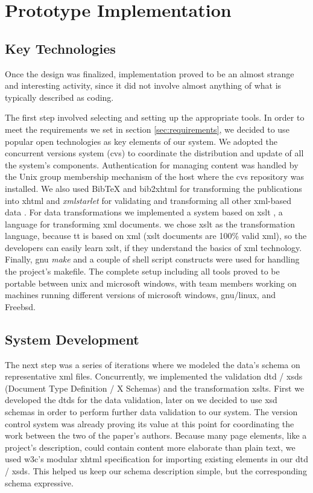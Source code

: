 \documentclass[10pt]{article}
\begin{document}
\section{Prototype Implementation}

\subsection{Key Technologies}
\label{subsec:key-tech}

Once the design was finalized,
implementation proved to be an almost strange and interesting activity,
since it did not involve almost anything of what
is typically described as coding.

The first step involved selecting and setting up the
appropriate tools. In order to meet the requirements we set in section \ref{sec:requirements}, 
we decided to use popular open
technologies as key elements of our system.
We adopted the concurrent versions system
({\sc cvs}) \cite{BF01, CVS} to coordinate the distribution
and update of all the system's components.
Authentication for managing content was handled by the
Unix group membership mechanism of the host where the
{\sc cvs} repository was installed.
We also used
{\sc BibTeX} \cite{Pa88, Lam94} and {\sc bib2xhtml} \cite{BibXHMTL} for transforming the publications
into {\sc xhtml} and
\textit{xmlstarlet} \cite{Gru04} for validating and transforming
all other {\sc xml}-based data \cite{W3C_XML}.
For data transformations we 
implemented a system based on {\sc xslt} \cite{W3C_XSLT}, a language for transforming {\sc xml} documents.
we chose {\sc xslt} as the transformation language, because tt is based on {\sc xml} ({\sc xslt} documents are 100\% valid {\sc xml}), so the
developers can easily learn xslt, if they understand the basics of {\sc xml} technology.
Finally, {\sc gnu} {\em make} \cite{gnu_make} and a couple of shell script
constructs were used for handling the project's makefile.
The complete setup including all tools proved to be portable
between {\sc unix} and {\sc microsoft windows}, with team members working
on machines running different versions of {\sc microsoft windows}, {\sc gnu/linux},
and Free{\sc bsd}.

\subsection{System Development}

The next step was a series of iterations where we
modeled the data's schema on representative {\sc xml}
files. Concurrently, we implemented the validation {\sc dtd / xsd}s (Document Type Definition / X Schemas)
and the transformation {\sc xslt}s. First we developed the {\sc dtd}s
for the data validation, later on we decided to use {\sc xsd} schemas in order to perform
further data validation to our system.
The version control system was already proving its value
at this point
for coordinating the work between the two of the paper's authors.
Because many page elements, like a project's description,
could contain content more elaborate than plain text,
we used {\sc w3c}'s modular {\sc xhtml} specification for
importing existing elements in our {\sc dtd / xsd}s.
This helped us keep our schema description simple,
but the corresponding schema expressive.
\end{document}
